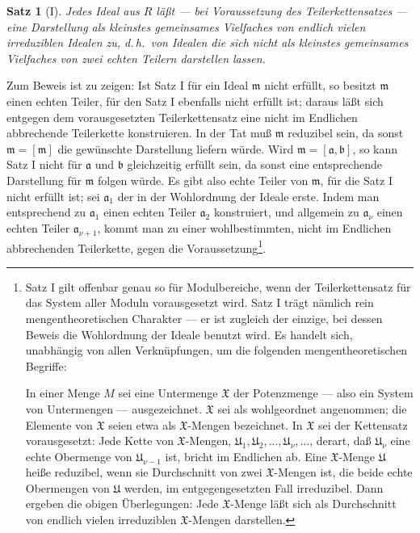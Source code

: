 \documentclass[12pt,a4paper]{article}
\theoremstyle{plain}
\newtheorem{Satz}{Satz}[section]
\theoremstyle{definition}
\theoremstyle{remark}
\begin{document}
\begin{Satz}[I]
Jedes Ideal aus $R$ läßt --- bei Voraussetzung des Teilerkettensatzes --- eine Darstellung als kleinstes gemeinsames Vielfaches von endlich vielen \textit{irreduziblen Idealen} zu, d.\,h.\ von Idealen die sich nicht als kleinstes gemeinsames Vielfaches von zwei echten Teilern darstellen lassen.
\end{Satz}

Zum Beweis ist zu zeigen: Ist Satz I für ein Ideal $\mathfrak{m}$ nicht erfüllt, so besitzt $\mathfrak{m}$ einen echten Teiler, für den Satz I ebenfalls nicht erfüllt ist; daraus läßt sich entgegen dem vorausgesetzten Teilerkettensatz eine nicht im Endlichen abbrechende Teilerkette konstruieren. In der Tat muß $\mathfrak{m}$ reduzibel sein, da sonst $\mathfrak{m} = [\mathfrak{m}]$ die gewünschte Darstellung liefern würde. Wird $\mathfrak{m} = [\mathfrak{a}, \mathfrak{b}]$, so kann Satz I nicht für $\mathfrak{a}$ und $\mathfrak{b}$ gleichzeitig erfüllt sein, da sonst eine entsprechende Darstellung für $\mathfrak{m}$ folgen würde. Es gibt also echte Teiler von $\mathfrak{m}$, für die Satz I nicht erfüllt ist; sei $\mathfrak{a}_{1}$ der in der Wohlordnung der Ideale erste. Indem man entsprechend zu $\mathfrak{a}_{1}$ einen echten Teiler $\mathfrak{a}_{2}$ konstruiert, und allgemein zu $\mathfrak{a}_{\nu}$ einen echten Teiler $\mathfrak{a}_{\nu+1}$, kommt man zu einer wohlbestimmten, nicht im Endlichen abbrechenden Teilerkette, gegen die Voraussetzung\footnote{Satz I gilt offenbar genau so für Modulbereiche, wenn der Teilerkettensatz für das System aller Moduln vorausgesetzt wird. Satz I trägt nämlich rein mengentheoretischen Charakter --- er ist zugleich der einzige, bei dessen Beweis die Wohlordnung der Ideale benutzt wird. Es handelt sich, unabhängig von allen Verknüpfungen, um die folgenden mengentheoretischen Begriffe:

In einer Menge $M$ sei eine Untermenge $\mathfrak{X}$ der Potenzmenge --- also ein System von Untermengen --- ausgezeichnet. $\mathfrak{X}$ sei als wohlgeordnet angenommen; die Elemente von $\mathfrak{X}$ seien etwa als $\mathfrak{X}$-Mengen bezeichnet. In $\mathfrak{X}$ sei der Kettensatz vorausgesetzt: Jede Kette von $\mathfrak{X}$-Mengen, $\mathfrak{U}_{1}, \mathfrak{U}_{2},\dots, \mathfrak{U}_{\nu},\dots$, derart, daß $\mathfrak{U}_{\nu}$ eine echte Obermenge von $\mathfrak{U}_{\nu-1}$ ist, bricht im Endlichen ab. Eine $\mathfrak{X}$-Menge $\mathfrak{U}$ heiße reduzibel, wenn sie Durchschnitt von zwei $\mathfrak{X}$-Mengen ist, die beide echte Obermengen von $\mathfrak{U}$ werden, im entgegengesetzten Fall irreduzibel. Dann ergeben die obigen Überlegungen: Jede $\mathfrak{X}$-Menge läßt sich als Durchschnitt von endlich vielen irreduziblen $\mathfrak{X}$-Mengen darstellen.}.
\end{document}
